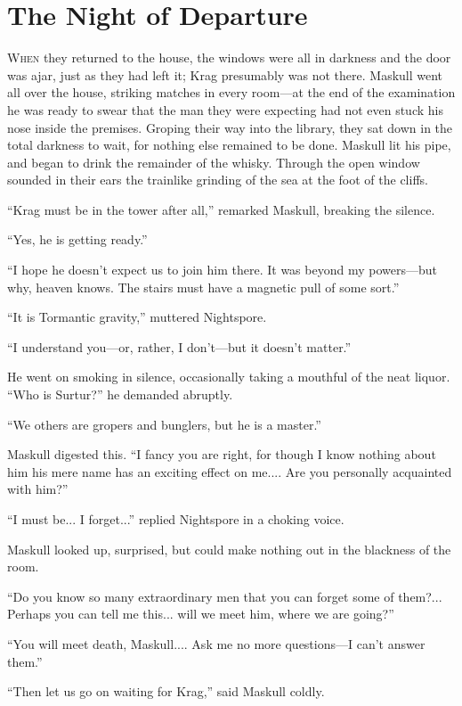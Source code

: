 \chapter{The Night of Departure}

\lettrine{W}{hen} they returned to the house, the windows were all in darkness and the door was ajar, just as they had left it; Krag presumably was not there. Maskull went all over the house, striking matches in every room—at the end of the examination he was ready to swear that the man they were expecting had not even stuck his nose inside the premises. Groping their way into the library, they sat down in the total darkness to wait, for nothing else remained to be done. Maskull lit his pipe, and began to drink the remainder of the whisky. Through the open window sounded in their ears the trainlike grinding of the sea at the foot of the cliffs.

``Krag must be in the tower after all,'' remarked Maskull, breaking the silence.

``Yes, he is getting ready.''

``I hope he doesn't expect us to join him there. It was beyond my powers—but why, heaven knows. The stairs must have a magnetic pull of some sort.''

``It is Tormantic gravity,'' muttered Nightspore.

``I understand you—or, rather, I don't—but it doesn't matter.''

He went on smoking in silence, occasionally taking a mouthful of the neat liquor. ``Who is Surtur?'' he demanded abruptly.

``We others are gropers and bunglers, but he is a master.''

Maskull digested this. ``I fancy you are right, for though I know nothing about him his mere name has an exciting effect on me.... Are you personally acquainted with him?''

``I must be... I forget...'' replied Nightspore in a choking voice.

Maskull looked up, surprised, but could make nothing out in the blackness of the room.

``Do you know so many extraordinary men that you can forget some of them?... Perhaps you can tell me this... will we meet him, where we are going?''

``You will meet death, Maskull.... Ask me no more questions—I can't answer them.''

``Then let us go on waiting for Krag,'' said Maskull coldly.

